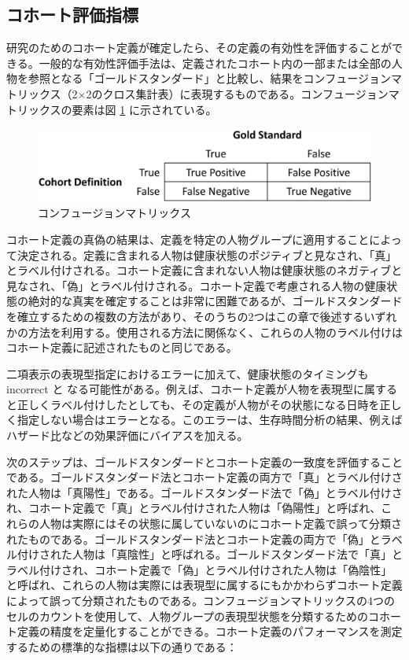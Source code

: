 \documentclass[
  11pt]{book}
\theoremstyle{definition}
\theoremstyle{definition}
\theoremstyle{definition}
\theoremstyle{definition}
\theoremstyle{remark}
\begin{document}
\subsection{コホート評価指標}\label{ux30b3ux30dbux30fcux30c8ux8a55ux4fa1ux6307ux6a19}

研究のためのコホート定義が確定したら、その定義の有効性を評価することができる。一般的な有効性評価手法は、定義されたコホート内の一部または全部の人物を参照となる「ゴールドスタンダード」と比較し、結果をコンフュージョンマトリックス（2×2のクロス集計表）に表現するものである。コンフュージョンマトリックスの要素は図 \ref{fig:matrix} に示されている。

\begin{figure}

{\centering \includegraphics[width=0.75\linewidth]{images/ClinicalValidity/matrix} 

}

\caption{コンフュージョンマトリックス}\label{fig:matrix}
\end{figure}

コホート定義の真偽の結果は、定義を特定の人物グループに適用することによって決定される。定義に含まれる人物は健康状態のポジティブと見なされ、「真」とラベル付けされる。コホート定義に含まれない人物は健康状態のネガティブと見なされ、「偽」とラベル付けされる。コホート定義で考慮される人物の健康状態の絶対的な真実を確定することは非常に困難であるが、ゴールドスタンダードを確立するための複数の方法があり、そのうちの2つはこの章で後述するいずれかの方法を利用する。使用される方法に関係なく、これらの人物のラベル付けはコホート定義に記述されたものと同じである。

二項表示の表現型指定におけるエラーに加えて、健康状態のタイミングも incorrect と なる可能性がある。例えば、コホート定義が人物を表現型に属すると正しくラベル付けしたとしても、その定義が人物がその状態になる日時を正しく指定しない場合はエラーとなる。このエラーは、生存時間分析の結果、例えばハザード比などの効果評価にバイアスを加える。

次のステップは、ゴールドスタンダードとコホート定義の一致度を評価することである。ゴールドスタンダード法とコホート定義の両方で「真」とラベル付けされた人物は「真陽性」である。ゴールドスタンダード法で「偽」とラベル付けされ、コホート定義で「真」とラベル付けされた人物は「偽陽性」と呼ばれ、これらの人物は実際にはその状態に属していないのにコホート定義で誤って分類されたものである。ゴールドスタンダード法とコホート定義の両方で「偽」とラベル付けされた人物は「真陰性」と呼ばれる。ゴールドスタンダード法で「真」とラベル付けされ、コホート定義で「偽」とラベル付けされた人物は「偽陰性」と呼ばれ、これらの人物は実際には表現型に属するにもかかわらずコホート定義によって誤って分類されたものである。コンフュージョンマトリックスの4つのセルのカウントを使用して、人物グループの表現型状態を分類するためのコホート定義の精度を定量化することができる。コホート定義のパフォーマンスを測定するための標準的な指標は以下の通りである：
\end{document}
